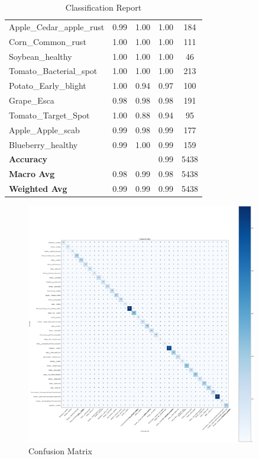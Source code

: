 \begin{table}[H]
\begin{tabular}{lcccc}
		Apple\_Cedar\_apple\_rust & 0.99 & 1.00 & 1.00 & 184 \\
		Corn\_Common\_rust & 1.00 & 1.00 & 1.00 & 111 \\
		Soybean\_healthy & 1.00 & 1.00 & 1.00 & 46 \\
		Tomato\_Bacterial\_spot & 1.00 & 1.00 & 1.00 & 213 \\
		Potato\_Early\_blight & 1.00 & 0.94 & 0.97 & 100 \\
		Grape\_Esca & 0.98 & 0.98 & 0.98 & 191 \\
		Tomato\_Target\_Spot & 1.00 & 0.88 & 0.94 & 95 \\
		Apple\_Apple\_scab & 0.99 & 0.98 & 0.99 & 177 \\
		Blueberry\_healthy & 0.99 & 1.00 & 0.99 & 159 \\
		\hline
		\textbf{Accuracy} & & & 0.99 & 5438 \\
		\textbf{Macro Avg} & 0.98 & 0.99 & 0.98 & 5438 \\
		\textbf{Weighted Avg} & 0.99 & 0.99 & 0.99 & 5438 \\
		\hline
	\end{tabular}
	\caption{Classification Report}
\end{table}

\begin{figure}[H]
    \centering
    \includegraphics[width= 0.9\textwidth]{assets/FTConfMatrix.png} 
    \caption{Confusion Matrix} 
    \label{fig:immagine}
\end{figure}


